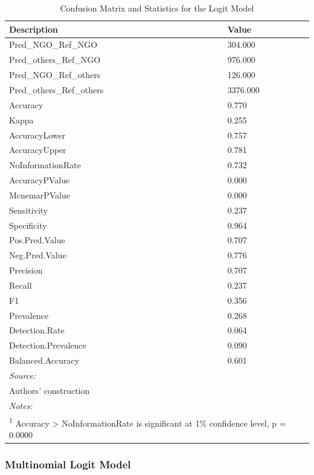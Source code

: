 \documentclass[a4paper, nobind]{templates/ociamthesis}
\begin{document}
\begin{table}

\caption{\label{tab:unnamed-chunk-44}Confusion Matrix and Statistics for the Logit Model}
\centering
\begin{tabular}[t]{ll}
\toprule
Description & Value\\
\midrule
Pred\_NGO\_Ref\_NGO & 304.000\\
Pred\_others\_Ref\_NGO & 976.000\\
Pred\_NGO\_Ref\_others & 126.000\\
Pred\_others\_Ref\_others & 3376.000\\
Accuracy & 0.770\\
\addlinespace
Kappa & 0.255\\
AccuracyLower & 0.757\\
AccuracyUpper & 0.781\\
NoInformationRate & 0.732\\
AccuracyPValue & 0.000\\
\addlinespace
McnemarPValue & 0.000\\
Sensitivity & 0.237\\
Specificity & 0.964\\
Pos.Pred.Value & 0.707\\
Neg.Pred.Value & 0.776\\
\addlinespace
Precision & 0.707\\
Recall & 0.237\\
F1 & 0.356\\
Prevalence & 0.268\\
Detection.Rate & 0.064\\
\addlinespace
Detection.Prevalence & 0.090\\
Balanced.Accuracy & 0.601\\
\bottomrule
\multicolumn{2}{l}{\rule{0pt}{1em}\textit{Source: }}\\
\multicolumn{2}{l}{\rule{0pt}{1em}Authors' construction}\\
\multicolumn{2}{l}{\rule{0pt}{1em}\textit{Notes: }}\\
\multicolumn{2}{l}{\rule{0pt}{1em}\textsuperscript{1} Accuracy > NoInformationRate is significant at 1\% confidence level, p = 0.0000}\\
\end{tabular}
\end{table}

\hypertarget{multinomial-logit-model-1}{%
\subsubsection{Multinomial Logit Model}\label{multinomial-logit-model-1}}
\end{document}
